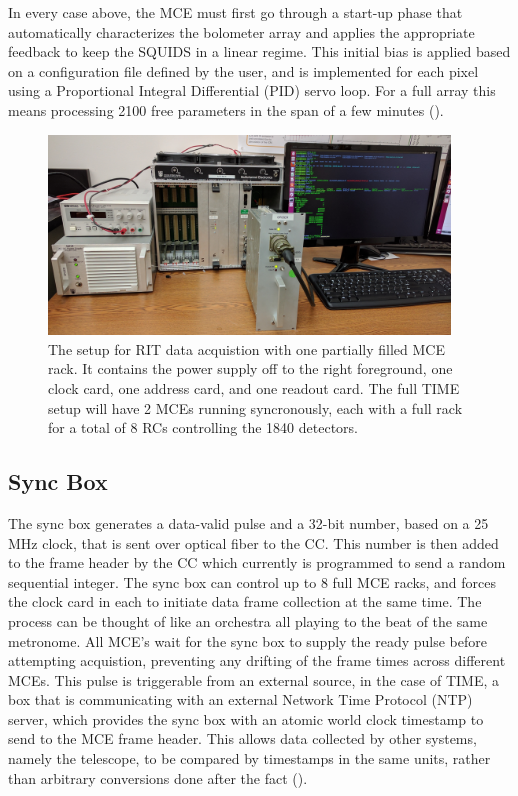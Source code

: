 \documentclass[manuscript]{aastex}
\begin{document}
In every case above, the MCE must first go through a start-up phase that automatically characterizes the bolometer array and applies the appropriate feedback to keep the SQUIDS in a linear regime. This initial bias is applied based on a configuration file defined by the user, and is implemented for each pixel using a Proportional Integral Differential (PID) servo loop. For a full array this means processing 2100 free parameters in the span of a few minutes (\cite{Dobbs2009}).

\begin{figure}[H]
\centering
\captionsetup{width=0.95\textwidth}
\includegraphics[width=0.95\textwidth]{mce1.jpg}
\caption[MCE RIT Setup with Incomplete Rack]{The setup for RIT data acquistion with one partially filled MCE rack. It contains the power supply off to the right foreground, one clock card, one address card, and one readout card. The full TIME setup will have 2 MCEs running syncronously, each with a full rack for a total of 8 RCs controlling the 1840 detectors.}
\label{fig:mce}
\vspace{-0.8cm}
\end{figure}

\subsection{Sync Box}
The sync box generates a data-valid pulse and a 32-bit number, based on a 25 MHz clock, that is sent over optical fiber to the CC. This number is then added to the frame header by the CC which currently is programmed to send a random sequential integer. The sync box can control up to 8 full MCE racks, and forces the clock card in each to initiate data frame collection at the same time. The process can be thought of like an orchestra all playing to the beat of the same metronome. All MCE's wait for the sync box to supply the ready pulse before attempting acquistion, preventing any drifting of the frame times across different MCEs. This pulse is triggerable from an external source, in the case of TIME, a box that is communicating with an external Network Time Protocol (NTP) server, which provides the sync box with an atomic world clock timestamp to send to the MCE frame header. This allows data collected by other systems, namely the telescope, to be compared by timestamps in the same units, rather than arbitrary conversions done after the fact (\cite{Battistelli2008}).
\end{document}
